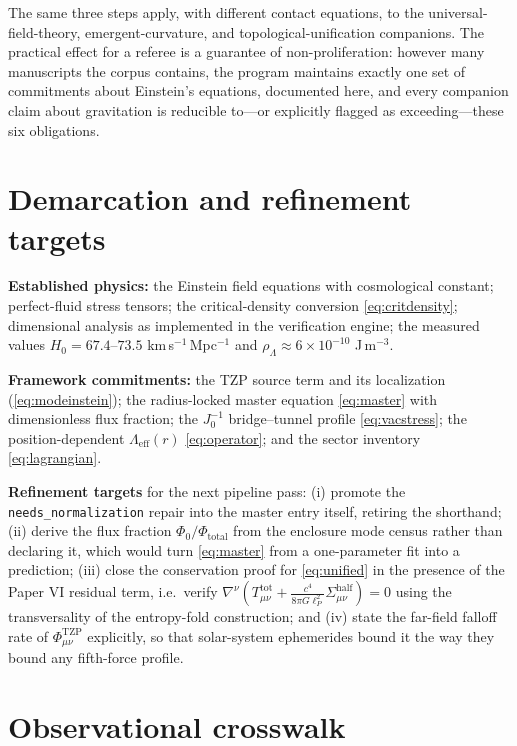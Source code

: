 \documentclass[11pt]{article}
\theoremstyle{remark}
\begin{document}
The same three steps apply, with different contact equations, to the universal-field-theory, emergent-curvature, and topological-unification companions. The practical effect for a referee is a guarantee of non-proliferation: however many manuscripts the corpus contains, the program maintains exactly one set of commitments about Einstein's equations, documented here, and every companion claim about gravitation is reducible to---or explicitly flagged as exceeding---these six obligations.

\section{Demarcation and refinement targets}
\label{sec:demarcation}

\textbf{Established physics:} the Einstein field equations with cosmological constant; perfect-fluid stress tensors; the critical-density conversion \eqref{eq:critdensity}; dimensional analysis as implemented in the verification engine; the measured values $H_0 = 67.4$--$73.5$ km\,s$^{-1}$\,Mpc$^{-1}$ and $\rho_\Lambda \approx 6 \times 10^{-10}$ J\,m$^{-3}$.

\textbf{Framework commitments:} the TZP source term and its localization (\eqref{eq:modeinstein}); the radius-locked master equation \eqref{eq:master} with dimensionless flux fraction; the $J_0^{-1}$ bridge--tunnel profile \eqref{eq:vacstress}; the position-dependent $\Lambda_{\mathrm{eff}}(r)$ \eqref{eq:operator}; and the sector inventory \eqref{eq:lagrangian}.

\textbf{Refinement targets} for the next pipeline pass: (i) promote the \texttt{needs\_normalization} repair into the master entry itself, retiring the shorthand; (ii) derive the flux fraction $\Phi_0/\Phi_{\mathrm{total}}$ from the enclosure mode census rather than declaring it, which would turn \eqref{eq:master} from a one-parameter fit into a prediction; (iii) close the conservation proof for \eqref{eq:unified} in the presence of the Paper VI residual term, i.e.\ verify $\nabla^\nu(T^{\mathrm{tot}}_{\mu\nu} + \frac{c^4}{8\pi G \ell_P^2}\Sigma^{\mathrm{half}}_{\mu\nu}) = 0$ using the transversality of the entropy-fold construction; and (iv) state the far-field falloff rate of $\Phi^{\mathrm{TZP}}_{\mu\nu}$ explicitly, so that solar-system ephemerides bound it the way they bound any fifth-force profile.

\section{Observational crosswalk}
\label{sec:crosswalk}
\end{document}
